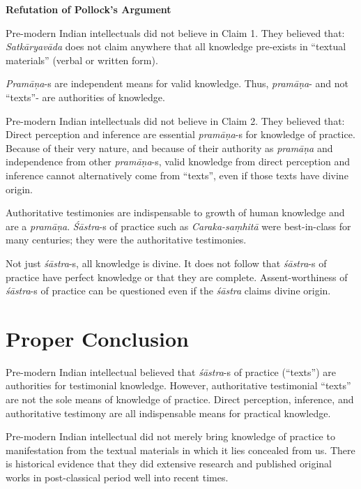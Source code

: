 {\bf Refutation of Pollock's Argument}

Pre-modern Indian intellectuals did not believe in Claim 1.  They believed that:
\textsl{Satkāryavāda} does not claim anywhere that all knowledge pre-exists in ``textual materials'' (verbal or written form).

\textsl{Pramāņa}-s are independent means for valid knowledge. Thus, {\sl pramāṇa}- and not ``texts''- are authorities of knowledge.

Pre-modern Indian intellectuals did not believe in Claim 2.  They believed that:
Direct perception and inference are essential {\sl pramāṇa}-s for knowledge of practice.  Because of their very nature, and because of their authority as {\sl pramāṇa} and independence from other {\sl pramāṇa}-s, valid knowledge from direct perception and inference cannot alternatively come from ``texts'', even if those texts have divine origin.

Authoritative testimonies are indispensable to growth of human knowledge and are a {\sl pramāṇa}.  {\sl Śāstra}-s of practice such as {\sl Caraka-saṃhitā} were best-in-class for many centuries; they were the authoritative testimonies.

Not just {\sl śāstra}-s, all knowledge is divine. It does not follow that {\sl śāstra}-s of practice have perfect knowledge or that they are complete.
Assent-worthiness of {\sl śāstra}-s of practice can be questioned even if the {\sl śāstra} claims divine origin.

\section*{Proper Conclusion}

Pre-modern Indian intellectual believed that {\sl śāstra}-s of practice (``texts'') are authorities for testimonial knowledge. However, authoritative testimonial ``texts'' are not the sole means of knowledge of practice. Direct perception, inference, and authoritative testimony are all indispensable means for practical knowledge.

Pre-modern Indian intellectual did not merely bring knowledge of practice to manifestation from the textual materials in which it lies concealed from us. There is historical evidence that they did extensive research and published original works in post-classical period well into recent times.

\newpage

